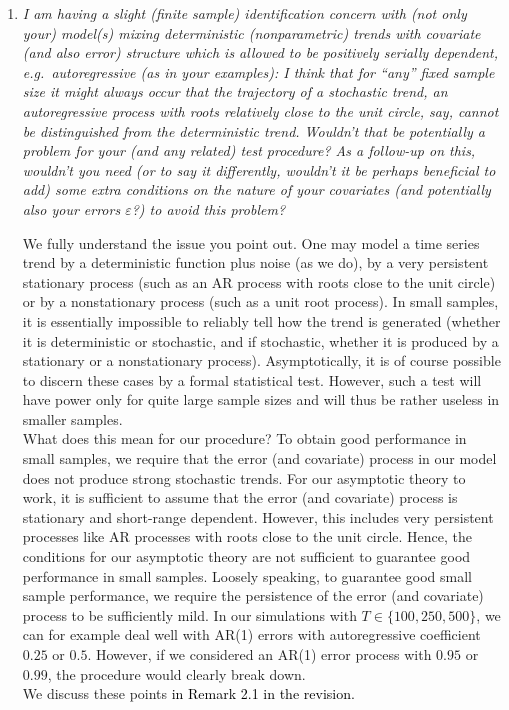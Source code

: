 \documentclass[a4paper,12pt]{article}
\newcommand{\reference}[1]{\textcolor{black}{#1}}
\begin{document}
\begin{enumerate}[label=\arabic*.,leftmargin=0.6cm]
\item \textit{I am having a slight (finite sample) identification concern with (not only your) model(s) mixing deterministic (nonparametric) trends with covariate (and also error) structure which is allowed to be positively serially dependent, e.g.\ autoregressive (as in your examples): I think that for ``any'' fixed sample size it might always occur that the trajectory of a stochastic trend, an autoregressive process with roots relatively close to the unit circle, say, cannot be distinguished from the deterministic trend. Wouldn't that be potentially a problem for your (and any related) test procedure? As a follow-up on this, wouldn't you need (or to say it differently, wouldn't it be perhaps beneficial to add) some extra conditions on the nature of your covariates (and potentially also your errors $\varepsilon$?) to avoid this problem?}

We fully understand the issue you point out. One may model a time series trend by a deterministic function plus noise (as we do), by a very persistent stationary process (such as an AR process with roots close to the unit circle) or by a nonstationary process (such as a unit root process). In small samples, it is essentially impossible to reliably tell how the trend is generated (whether it is deterministic or stochastic, and if stochastic, whether it is produced by a stationary or a nonstationary process). Asymptotically, it is of course possible to discern these cases by a formal statistical test. However, such a test will have power only for quite large sample sizes and will thus be rather useless in smaller samples. \\
What does this mean for our procedure? To obtain good performance in small samples, we require that the error (and covariate) process in our model does not produce strong stochastic trends. For our asymptotic theory to work, it is sufficient to assume that the error (and covariate) process is stationary and short-range dependent. However, this includes very persistent processes like AR processes with roots close to the unit circle. Hence, the conditions for our asymptotic theory are not sufficient to guarantee good performance in small samples. Loosely speaking, to guarantee good small sample performance, we require the persistence of the error (and covariate) process to be sufficiently mild. In our simulations with $T \in \{100,250,500\}$, we can for example deal well with AR(1) errors with autoregressive coefficient $0.25$ or $0.5$. However, if we considered an AR(1) error process with $0.95$ or $0.99$, the procedure would clearly break down. \\
We discuss these points \reference{in Remark 2.1 in the revision.}


\end{enumerate}
\end{document}
